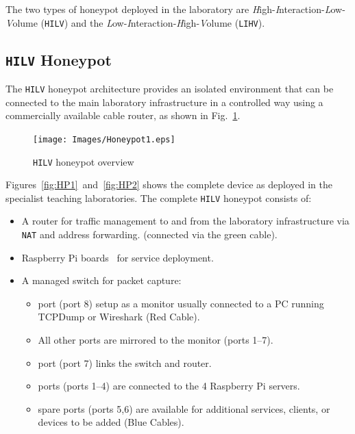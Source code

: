 \documentclass[10pt,journal]{IEEEtran}
\begin{document}
The two types of honeypot deployed in the laboratory are
\emph{H}igh-\emph{I}nteraction-\emph{L}ow-\emph{V}olume (\texttt{HILV}) and the
\emph{L}ow-\emph{I}nteraction-\emph{H}igh-\emph{V}olume (\texttt{LIHV}).

\subsection{\texttt{HILV} Honeypot}

The \texttt{HILV} honeypot architecture provides an isolated environment that
can be connected to the main laboratory infrastructure in a controlled way
using a commercially available cable router, as shown in
Fig.~\ref{fig:HPOverview}.

\begin{figure}[!ht]
\begin{center}
	\texttt{[image: Images/Honeypot1.eps]}
\caption{\texttt{HILV} honeypot overview}
\label{fig:HPOverview}
\end{center}
\end{figure}

Figures~\ref{fig:HP1}~and~\ref{fig:HP2} shows the complete device as deployed
in the specialist teaching laboratories. The complete \texttt{HILV} honeypot
consists of:

\begin{itemize}
    \item \noindent A router for traffic management to and from the laboratory
      infrastructure via \texttt{NAT} and address forwarding. (connected via the
      green cable). 
    \item {} Raspberry Pi boards~\cite{RASP:17} for service deployment.
    \item \noindent A managed switch for packet capture:
    \begin{itemize}
        \item {} port (port 8) setup as a monitor usually connected to
          a PC running TCPDump or Wireshark (Red Cable).
        \item \noindent All other ports are mirrored to the monitor (ports
          1--7).
        \item {} port (port 7) links the switch and router.
        \item {} ports (ports 1--4) are connected to the 4 Raspberry Pi 
        servers.
        \item {} spare ports (ports 5,6) are available for additional
          services, clients, or devices to be added (Blue Cables).
    \end{itemize}
\end{itemize}
\end{document}
